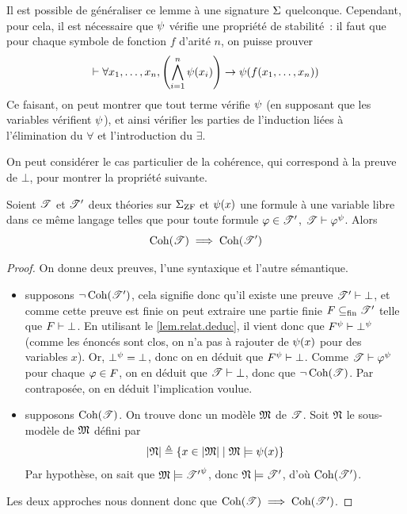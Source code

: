 \begin{remark}
  Il est possible de généraliser ce lemme à une signature $\Sigma$ quelconque.
  Cependant, pour cela, il est nécessaire que $\psi$ vérifie une propriété de
  stabilité~: il faut que pour chaque symbole de fonction $f$ d'arité $n$,
  on puisse prouver
  \[\vdash\forall x_1,\ldots,x_n, \left(\bigwedge_{i = 1}^n \psi(x_i)\right)
  \to \psi(f(x_1,\ldots,x_n))\]
  Ce faisant, on peut montrer que tout terme vérifie $\psi$ (en supposant que
  les variables vérifient $\psi$), et ainsi vérifier les parties de
  l'induction liées à l'élimination du $\forall$ et l'introduction du $\exists$.
\end{remark}

On peut considérer le cas particulier de la cohérence, qui correspond à la
preuve de $\bot$, pour montrer la propriété suivante.

\begin{theorem}
  Soient $\mathscr T$ et $\mathscr T'$ deux théories sur $\Sigma_{\operatorname{ZF}}$ et
  $\psi(x)$ une formule à une variable libre dans ce même langage telles que
  pour toute formule $\varphi \in \mathscr T'$, $\mathscr T\vdash \varphi^\psi$. Alors
  \[\operatorname{Coh}(\mathscr T) \implies \operatorname{Coh}(\mathscr T')\]
\end{theorem}

\begin{proof}
  On donne deux preuves, l'une syntaxique et l'autre sémantique.
  \begin{itemize}
  \item supposons $\lnot\operatorname{Coh}(\mathscr T')$, cela signifie donc qu'il existe une
    preuve $\mathscr T'\vdash \bot$, et comme cette preuve est finie on peut
    extraire une partie finie $F\subseteq_{\mathrm{fin}} \mathscr T'$ telle que $F\vdash \bot$.
    En utilisant le \cref{lem.relat.deduc}, il vient donc que
    $F^\psi\vdash \bot^\psi$ (comme les énoncés sont clos, on n'a pas à rajouter
    de $\psi(x)$ pour des variables $x$). Or, $\bot^\psi = \bot$, donc on en
    déduit que $F^\psi\vdash \bot$. Comme $\mathscr T\vdash \varphi^\psi$ pour
    chaque $\varphi \in F$, on en déduit que $\mathscr T\vdash \bot$, donc que
    $\lnot\operatorname{Coh}(\mathscr T)$. Par contraposée, on en déduit l'implication
    voulue.
  \item supposons $\operatorname{Coh}(\mathscr T)$. On trouve donc un modèle $\mathfrak{M}$
    de $\mathscr T$. Soit $\mathfrak{N}$ le sous-modèle de $\mathfrak{M}$ défini
    par
    \[\left\vert \mathfrak{N}\right\vert\triangleq \left\{ x\in\left\vert \mathfrak{M}\right\vert \;\middle\vert\; \mathfrak{M}\models\psi(x) \right\}\]
    Par hypothèse, on sait que $\mathfrak{M}\models{\mathscr T'}^\psi$, donc
    $\mathfrak{N}\models \mathscr T'$, d'où $\operatorname{Coh}(\mathscr T')$.
  \end{itemize}

  Les deux approches nous donnent donc que
  $\operatorname{Coh}(\mathscr T)\implies\operatorname{Coh}(\mathscr T')$.
\end{proof}

